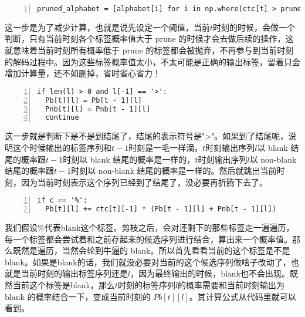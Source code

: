 \begin{lstlisting}[language = shell, numbers=left, 
         numberstyle=\tiny,keywordstyle=\color{blue!70},
         commentstyle=\color{red!50!green!50!blue!50},frame=shadowbox,
         rulesepcolor=\color{red!20!green!20!blue!20},basicstyle=\ttfamily]
pruned_alphabet = [alphabet[i] for i in np.where(ctc[t] > prune)[0]]
\end{lstlisting}

这一步是为了减少计算，也就是说先设定一个阈值，当前$t$时刻的时候，会做一个判断，只有当前时刻各个标签概率值大于 prune 的时候才会去做后续的操作，这就意味着当前时刻所有概率低于 prune 的标签都会被抛弃，不再参与到当前时刻的解码过程中。因为这些标签概率值太小，不太可能是正确的输出标签，留着只会增加计算量，还不如删掉，省时省心省力！

\begin{lstlisting}[language = shell, numbers=left, 
         numberstyle=\tiny,keywordstyle=\color{blue!70},
         commentstyle=\color{red!50!green!50!blue!50},frame=shadowbox,
         rulesepcolor=\color{red!20!green!20!blue!20},basicstyle=\ttfamily]
if len(l) > 0 and l[-1] == '>':
  Pb[t][l] = Pb[t - 1][l]
  Pnb[t][l] = Pnb[t - 1][l]
  continue 
\end{lstlisting}

这一步就是判断下是不是到结尾了，结尾的表示符号是">"。如果到了结尾呢，说明这个时候输出的标签序列和$t-1$时刻是一毛一样滴。$t$时刻输出序列$l$以 blank 结尾的概率跟$t-1$时刻以 blank 结尾的概率是一样的，$t$时刻输出序列$l$以 non-blank 结尾的概率跟$t-1$时刻以 non-blank 结尾的概率是一样的。然后就跳出当前时刻，因为当前时刻表示这个序列已经到了结尾了，没必要再折腾下去了。
 
\begin{lstlisting}[language = shell, numbers=left, 
         numberstyle=\tiny,keywordstyle=\color{blue!70},
         commentstyle=\color{red!50!green!50!blue!50},frame=shadowbox,
         rulesepcolor=\color{red!20!green!20!blue!20},basicstyle=\ttfamily]
if c == '%':
  Pb[t][l] += ctc[t][-1] * (Pb[t - 1][l] + Pnb[t - 1][l])
\end{lstlisting}

我们假设$\%$代表blank这个标签。剪枝之后，会对还剩下的那些标签走一遍遍历，每一个标签都会尝试着和之前存起来的候选序列进行结合，算出来一个概率值。那么既然是遍历，当然会轮到牛逼的 blank。所以首先看看当前的这个标签是不是blank。如果是blank的话，我们就没必要对当前的这个候选序列做啥子改动了，也就是当前时刻的输出标签序列还是$l$，因为最终输出的时候，blank也不会出现。既然当前这个标签是blank，那么$t$时刻的标签序列$l$的概率需要和当前时刻输出为 blank 的概率结合一下，变成当前时刻的 $Pb[t][l]$。其计算公式从代码里就可以看到。

